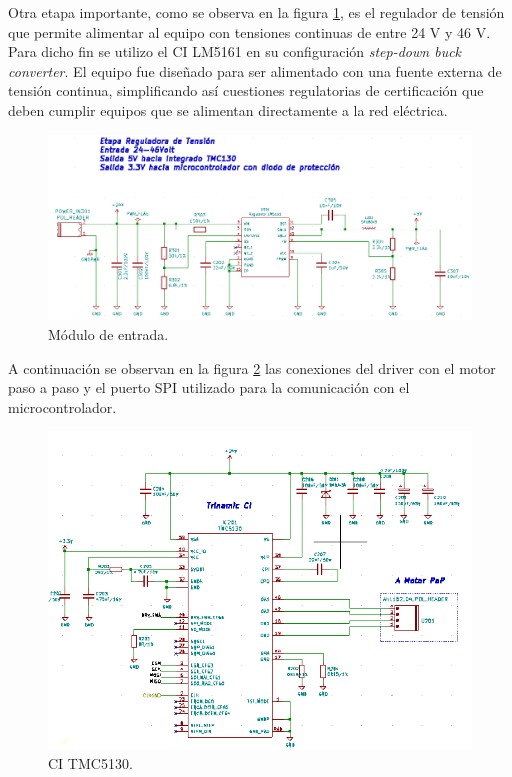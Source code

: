 Otra etapa importante, como se observa en la figura \ref{fig:kicad_tension}, es el regulador de tensión que permite alimentar al equipo con tensiones continuas de entre 24 V y 46 V. Para dicho fin se utilizo el CI LM5161 en su configuración \textit{step-down buck converter}. 
El equipo fue diseñado para ser alimentado con una fuente externa de tensión continua, simplificando así cuestiones regulatorias de certificación que deben cumplir equipos que se alimentan directamente a la red eléctrica.


\begin{figure}[h]
	\centering
	\includegraphics[width=1\textwidth]{./Figures/kicad_tension.png}
	\caption{Módulo de entrada.}
	\label{fig:kicad_tension}
\end{figure}
 
A continuación se observan en la figura \ref{fig:kicad_trinamic} las conexiones del driver con el motor paso a paso y el puerto SPI utilizado para la comunicación con el microcontrolador. 
 
\begin{figure}[h]
	\centering
	\includegraphics[width=1\textwidth]{./Figures/kicad_trinamic.png}
	\caption{CI TMC5130.}
	\label{fig:kicad_trinamic}
\end{figure} 
 
